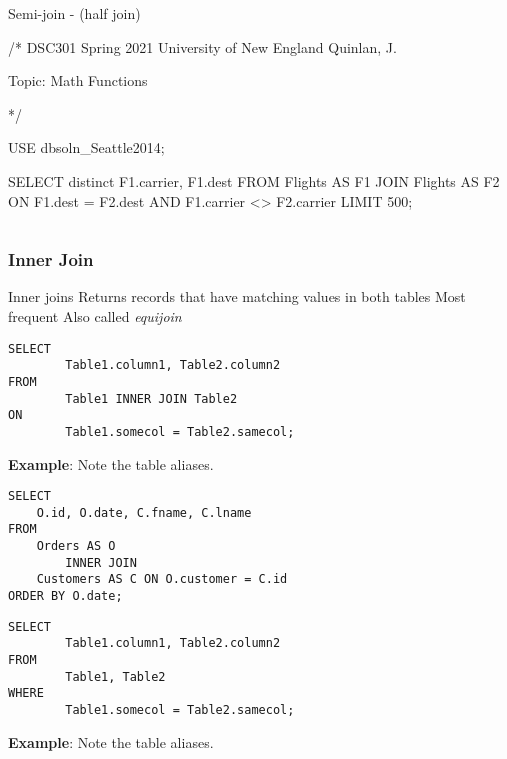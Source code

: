 \documentclass{article}
\begin{document}
        \1 Semi-join - (half join)
        
  
  
  
  
 /*
DSC301 Spring 2021
University of New England
Quinlan, J.

Topic: Math Functions

*/

USE dbsoln_Seattle2014;

SELECT 
    distinct F1.carrier, F1.dest
FROM
    Flights AS F1
        JOIN
    Flights AS F2 ON F1.dest = F2.dest
        AND F1.carrier <> F2.carrier LIMIT 500; 



      
        
\[


 
 
 
 
\]


 
  
 \subsubsection*{Inner Join}
  
  \begin{outline}
        \1 Inner joins
                \2 Returns records that have matching values in both tables
                \2 Most frequent
                \2 Also called \textit{equijoin}
    \end{outline}
  
                  

\begin{lstlisting}[frame=single]  
SELECT 
        Table1.column1, Table2.column2 
FROM 
        Table1 INNER JOIN Table2
ON 
        Table1.somecol = Table2.samecol;
\end{lstlisting} 
%
%      
  \textbf{Example}: Note the table aliases.          
                

\begin{lstlisting}[frame=single]  
SELECT 
    O.id, O.date, C.fname, C.lname
FROM
    Orders AS O
        INNER JOIN
    Customers AS C ON O.customer = C.id
ORDER BY O.date; 
\end{lstlisting} 
%
%              


         
\begin{lstlisting}[frame=single]  
SELECT 
        Table1.column1, Table2.column2 
FROM 
        Table1, Table2
WHERE 
        Table1.somecol = Table2.samecol;
\end{lstlisting} 
%
%      
  \textbf{Example}: Note the table aliases.          
                
\end{document}
